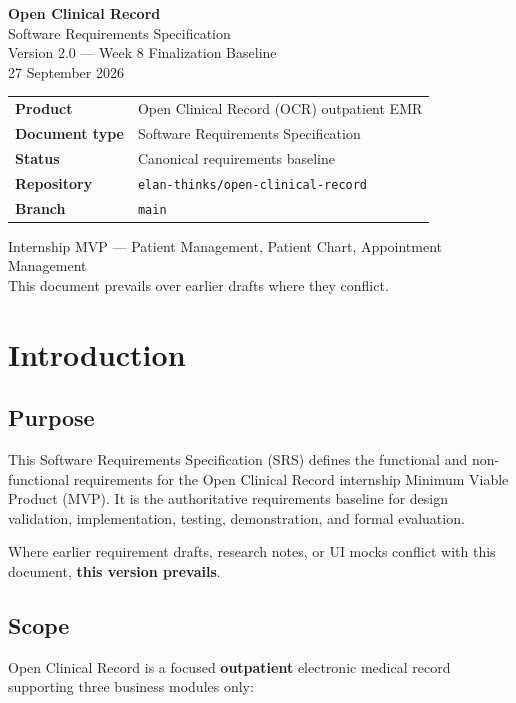 \documentclass[11pt,a4paper]{article}
\begin{document}
\begin{titlepage}
\centering
\vspace*{1.5cm}
{\LARGE\bfseries Open Clinical Record}\\[0.4cm]
{\Large Software Requirements Specification}\\[1.2cm]
{\large Version 2.0 --- Week 8 Finalization Baseline}\\[0.6cm]
{\large 27 September 2026}\\[1.5cm]
\begin{tabular}{ll}
\toprule
\textbf{Product} & Open Clinical Record (OCR) outpatient EMR \\
\textbf{Document type} & Software Requirements Specification \\
\textbf{Status} & Canonical requirements baseline \\
\textbf{Repository} & \texttt{elan-thinks/open-clinical-record} \\
\textbf{Branch} & \texttt{main} \\
\bottomrule
\end{tabular}
\vfill
{\small Internship MVP --- Patient Management, Patient Chart, Appointment Management}\\[0.3cm]
{\small This document prevails over earlier drafts where they conflict.}
\end{titlepage}

\tableofcontents
\newpage

\section{Introduction}

\subsection{Purpose}
This Software Requirements Specification (SRS) defines the functional and non-functional requirements for the Open Clinical Record internship Minimum Viable Product (MVP). It is the authoritative requirements baseline for design validation, implementation, testing, demonstration, and formal evaluation.

Where earlier requirement drafts, research notes, or UI mocks conflict with this document, \textbf{this version prevails}.

\subsection{Scope}
Open Clinical Record is a focused \textbf{outpatient} electronic medical record supporting three business modules only:
\end{document}
